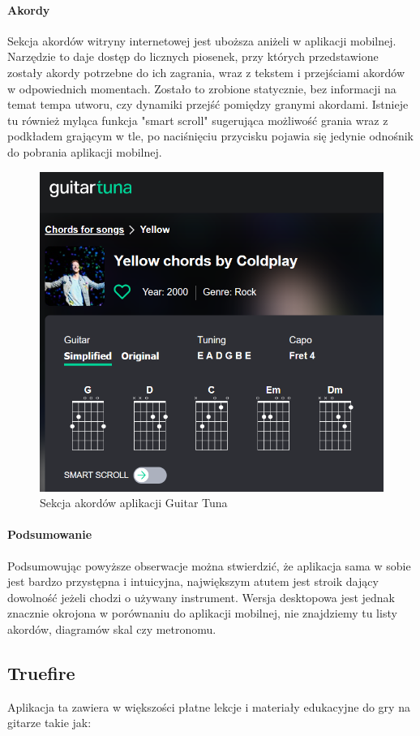 \paragraph{Akordy}
Sekcja akordów witryny internetowej jest uboższa aniżeli w aplikacji mobilnej. Narzędzie to daje dostęp do licznych piosenek, przy których przedstawione zostały akordy potrzebne do ich zagrania, wraz z tekstem i przejściami akordów w odpowiednich momentach. Zostało to zrobione statycznie, bez informacji na temat tempa utworu, czy dynamiki przejść pomiędzy granymi akordami. Istnieje tu również myląca funkcja "smart scroll" sugerująca możliwość grania wraz z podkładem grającym w tle, po naciśnięciu przycisku pojawia się jedynie odnośnik do pobrania aplikacji mobilnej.\\

\begin{figure}[htb]
	\centering
	\includegraphics[width=.4\linewidth]{rys02/ChordsGT}
	\caption{Sekcja akordów aplikacji Guitar Tuna} \label{fig:pageLayout}
\end{figure}

\paragraph{Podsumowanie}

Podsumowując powyższe obserwacje można stwierdzić, że aplikacja sama w sobie jest bardzo przystępna i intuicyjna, największym atutem jest stroik dający dowolność jeżeli chodzi o używany instrument. Wersja desktopowa jest jednak znacznie okrojona w porównaniu do aplikacji mobilnej, nie znajdziemy tu listy akordów, diagramów skal czy metronomu. 

\subsection{Truefire}

Aplikacja ta zawiera w większości płatne lekcje i materiały edukacyjne do gry na gitarze takie jak:

